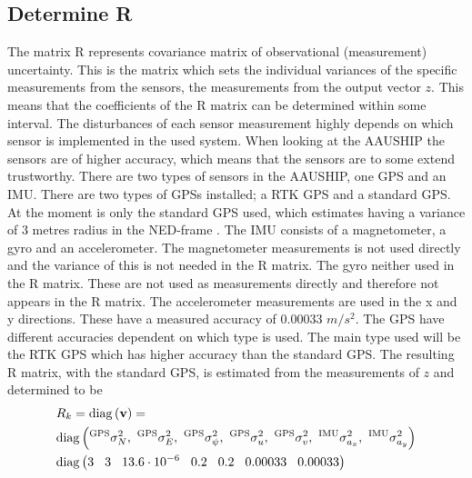 \subsection{Determine R}
The matrix R represents covariance matrix of observational (measurement) uncertainty. This is the matrix which sets the individual variances of the specific measurements from the sensors, the measurements from the output vector $z$. This means that the coefficients of the R matrix can be determined within some interval. The disturbances of each sensor measurement highly depends on which sensor is implemented in the used system. When looking at the AAUSHIP the sensors are of higher accuracy, which means that the sensors are to some extend trustworthy. There are two types of sensors in the AAUSHIP, one \ac{GPS} and an \ac{IMU}. There are two types of \ac{GPS}s installed; a \ac{RTK} \ac{GPS} and a standard \ac{GPS}. At the moment is only the standard \ac{GPS} used, which estimates having a variance of 3 metres radius in the \ac{NED}-frame . The \ac{IMU} consists of a magnetometer, a gyro and an accelerometer. The magnetometer measurements is not used directly and the variance of this is not needed in the R matrix. The gyro neither used in the R matrix. These are not used as measurements directly and therefore not appears in the R matrix. The accelerometer measurements are used in the x and y directions. These have a measured accuracy of 0.00033 $m/s^2$. The \ac{GPS} have different accuracies dependent on which type is used. The main type used will be the \ac{RTK} \ac{GPS} which has higher accuracy than the standard \ac{GPS}. The resulting R matrix, with the standard \ac{GPS}, is estimated from the measurements of $z$ and determined to be
\begin{align}
&R_k = \diag{\mathbf{v}} =\\ \nonumber
&\diag{^\text{GPS}\sigma_{N}^2,\ ^\text{GPS}\sigma_{E}^2,\ ^\text{GPS}\sigma_{\psi}^2,\ ^\text{GPS}\sigma_{u}^2,\ ^\text{GPS}\sigma_{v}^2,\ ^\text{IMU}\sigma_{a_x}^2,\ ^\text{IMU}\sigma_{a_y}^2}\\ \nonumber
&\diag{3\hspace{3mm} 3\hspace{3mm} 13.6\cdot 10^{-6}\hspace{3mm} 0.2\hspace{3mm} 0.2\hspace{3mm} 0.00033\hspace{3mm} 0.00033}
\end{align}

